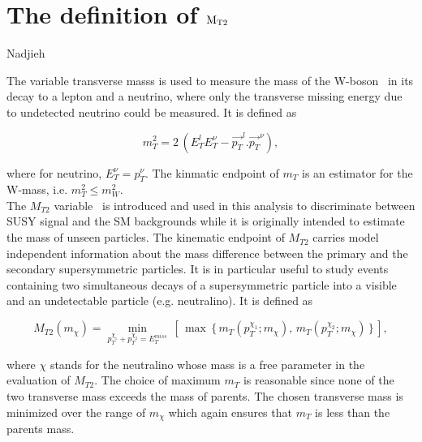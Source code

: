 \section{\texorpdfstring{The definition of $\rm {M_{T2}}$}{The definition of MT2}}
\label{sect:mt2def}

Nadjieh

The variable transverse masss is used to measure the mass of the W-boson~\cite{Arnison:1983rp,Banner:1983jy,Affolder:2000bpa,Abazov:2002bu} in its decay to a lepton and a neutrino, where only the transverse missing energy due to undetected neutrino could be measured. It is defined as 
\begin{linenomath}
\begin{equation}
\label{eq:mtdef}
m_{T}^{2}= 2\,( E_T^lE_T^\nu-\vec{p_T}^l.\vec{p_T}^\nu ),
\end{equation}
\end{linenomath}
where for neutrino, $E_T^\nu=p_T^\nu$. The kinmatic endpoint of $m_T$ is an estimator for the W-mass, i.e. $m_T^2\leq m_W^2$. \\
The $M_{T2}$ variable~\cite{Lester:1999tx,Barr:2003rg} is introduced and used in this analysis to discriminate between SUSY signal and the SM backgrounds while it is originally intended to estimate the mass of unseen particles. The kinematic endpoint of $M_{T2}$ carries model independent information about the mass difference between the primary and the secondary supersymmetric particles. It is in particular useful to study events containing two simultaneous decays of a supersymmetric particle into a visible and an undetectable particle (e.g. neutralino). It is defined as
\begin{linenomath}
\begin{equation}
\label{eq:mt2def}
M_{T2}(m_{\chi})= \min_{p_{T}^{\chi_1}+p_{T}^{\chi_2}=E_T^{miss}}\,\left[\,\max\,\{ \, m_{T}(p_T^{\chi_1};m_{\chi}),\,m_{T}(p_T^{\chi_2};m_{\chi})\,\}\,\right],
\end{equation}
\end{linenomath}
where $\chi$ stands for the neutralino whose mass is a free parameter in the evaluation of $M_{T2}$. The choice of maximum $m_T$ is reasonable since none of the two transverse mass exceeds the mass of parents. The chosen transverse mass is minimized over the range of $m_{\chi}$ which again ensures that $m_T$ is less than the parents mass. \\
